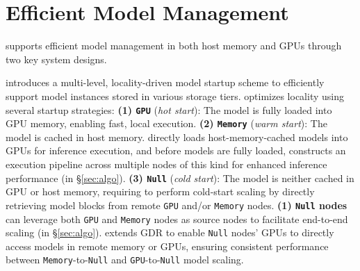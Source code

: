\section{Efficient Model Management}
\label{sec:system}


\SysName supports efficient model management in both host memory and GPUs through two key system designs.

\SysName introduces a multi-level, locality-driven model startup scheme to efficiently support model instances stored in various storage tiers. \SysName optimizes locality using several startup strategies: 
\textbf{(1) \texttt{GPU}} (\emph{hot start}): The model is fully loaded into GPU memory, enabling fast, local execution.
\textbf{(2) \texttt{Memory}} (\emph{warm start}): The model is cached in host memory. \SysName directly loads host-memory-cached models into GPUs for inference execution, and before models are fully loaded, constructs an execution pipeline across multiple nodes of this kind for enhanced inference performance (\AlgoName in \S\ref{sec:algo}). 
\textbf{(3) \texttt{Null}} (\emph{cold start}): The model is neither cached in GPU or host memory, requiring \SysName to perform cold-start scaling by directly retrieving model blocks from remote \texttt{GPU} and/or \texttt{Memory} nodes. 
\textbf{(1) \texttt{Null} nodes} can leverage both \texttt{GPU} and \texttt{Memory} nodes as source nodes to facilitate end-to-end scaling (\AlgoName in \S\ref{sec:algo}). 
\SysName extends GDR to enable \texttt{Null} nodes' GPUs to directly access models in remote memory or GPUs, ensuring consistent performance between \texttt{Memory}-to-\texttt{Null} and \texttt{GPU}-to-\texttt{Null} model scaling.
